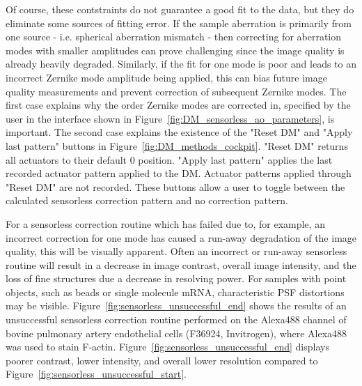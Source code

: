Of course, these contstraints do not guarantee a good fit to the data, but 
they do eliminate some sources of fitting error. If the sample aberration is 
primarily from one source - i.e. spherical aberration mismatch - then 
correcting for aberration modes with smaller amplitudes can prove challenging 
since the image quality is already heavily degraded. Similarly, if the fit 
for one mode is poor and leads to an incorrect Zernike mode amplitude being 
applied, this can bias future image quality measurements and prevent 
correction of subsequent Zernike modes. The first case explains why the order 
Zernike modes are corrected in, specified by the user in the interface shown 
in Figure~\ref{fig:DM_sensorless_ao_parameters}, is important. The second 
case explains the existence of the "Reset DM" and "Apply last pattern" 
buttons in Figure~\ref{fig:DM_methods_cockpit}. "Reset DM" returns all 
actuators to their default 0 position. "Apply last pattern" applies the last 
recorded actuator pattern applied to the DM. Actuator patterns applied 
through "Reset DM" are not recorded. These buttons allow a user to toggle 
between the calculated sensorless correction pattern and no correction 
pattern. 

For a sensorless correction routine which has failed due to, for example, an 
incorrect correction for one mode has caused a run-away degradation of the 
image quality, this will be visually apparent. Often an incorrect or run-away 
sensorless routine will result in a decrease in image contrast, overall image 
intensity, and the loss of fine structures due a decrease in resolving power. 
For samples with point objects, such as beads or single molecule mRNA, 
characteristic PSF distortions may be visible. 
Figure~\ref{fig:sensorless_unsuccessful_end} shows the results of an 
unsuccessful sensorless correction routine performed on the Alexa488 channel 
of bovine pulmonary artery endothelial cells (F36924, Invitrogen), where 
Alexa488 was used to stain F-actin. 
Figure~\ref{fig:sensorless_unsuccessful_end} displays poorer contrast, lower 
intensity, and overall lower resolution compared to 
Figure~\ref{fig:sensorless_unsuccessful_start}.

